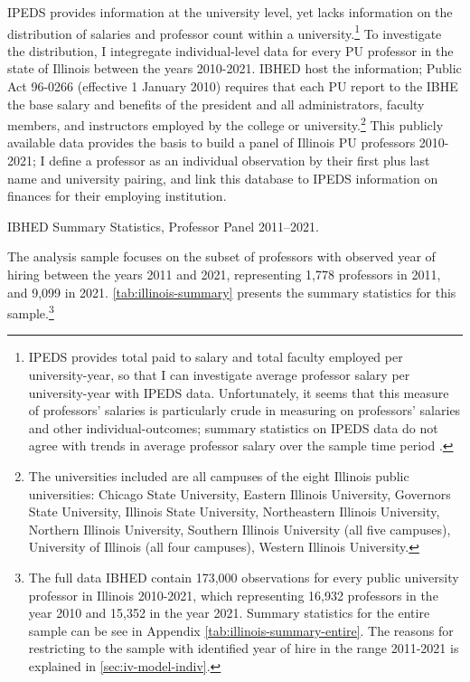 \documentclass[notitlepage,12pt]{article}
\begin{document}
IPEDS provides information at the university level, yet lacks information on the distribution of salaries and professor count within a university.\footnote{
    IPEDS provides total paid to salary and total faculty employed per university-year, so that I can investigate average professor salary per university-year with IPEDS data.
    Unfortunately, it seems that this measure of professors' salaries is particularly crude in measuring on professors' salaries and other individual-outcomes; summary statistics on IPEDS data do not agree with trends in average professor salary over the sample time period \citep{aau2021survey}.
}
To investigate the distribution, I integregate individual-level data for every PU professor in the state of Illinois between the years 2010-2021.
IBHED host the information;
Public Act 96-0266 (effective 1 January 2010) requires that each PU report to the IBHE the base salary and benefits of the president and all administrators, faculty members, and instructors employed by the college or university.\footnote{
    The universities included are all campuses of the eight Illinois public universities: Chicago State University, Eastern Illinois University, Governors State University, Illinois State University, Northeastern Illinois University, Northern Illinois University, Southern Illinois University  (all five campuses), University of Illinois (all four campuses), Western Illinois University.
}
This publicly available data provides the basis to build a panel of Illinois PU professors 2010-2021; I define a professor as an individual observation by their first plus last name and university pairing, and link this database to IPEDS information on finances for their employing institution.
\begin{table}[h!]
    \onehalfspacing
    \centering
    \caption{IBHED Summary Statistics, Professor Panel 2011--2021.}
    \makebox[\textwidth][c]{}
    \label{tab:illinois-summary}
\end{table}
The analysis sample focuses on the subset of professors with observed year of hiring between the years 2011 and 2021, representing 1,778 professors in 2011, and 9,099 in 2021.
\autoref{tab:illinois-summary} presents the summary statistics for this sample.\footnote{
    The full data IBHED contain 173,000 observations for every public university professor in Illinois 2010-2021, which representing 16,932 professors in the year 2010 and 15,352 in the year 2021.
    Summary statistics for the entire sample can be see in Appendix \autoref{tab:illinois-summary-entire}.
    The reasons for restricting to the sample with identified year of hire in the range 2011-2021 is explained in \autoref{sec:iv-model-indiv}.
}
\end{document}
